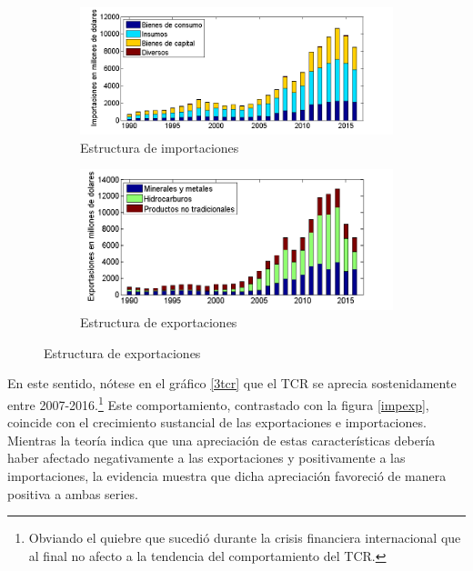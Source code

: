 \documentclass[12pt,letterpaper]{article}
\begin{document}
\begin{figure}
\captionsetup[subfigure]{aboveskip=-2pt,belowskip=-2pt}
\centering
\caption{Estructura de importaciones y exportaciones de Bolivia}\label{impexp}
    \begin{subfigure}[h]{0.65\textwidth}
        \includegraphics[width=\textwidth]{imp9016}
        \caption{Estructura de importaciones}
        \label{mestr}
    \end{subfigure}
    \begin{subfigure}[h]{0.65\textwidth}
        \includegraphics[width=\textwidth]{exp9016}
        \caption{Estructura de exportaciones}
        \label{xestr}
    \end{subfigure}
\end{figure}

En este sentido, nótese en el gráfico \ref{3tcr} que el TCR se aprecia sostenidamente entre 2007-2016.\footnote{Obviando el quiebre que sucedió durante la crisis financiera internacional que al final no afecto a la tendencia del comportamiento del TCR.} Este comportamiento, contrastado con la figura \ref{impexp}, coincide con el crecimiento sustancial de las exportaciones e importaciones. Mientras la teoría indica que una apreciación de estas características debería haber afectado negativamente a las exportaciones y positivamente a las importaciones, la evidencia muestra que dicha apreciación favoreció de manera positiva a ambas series.
\end{document}

